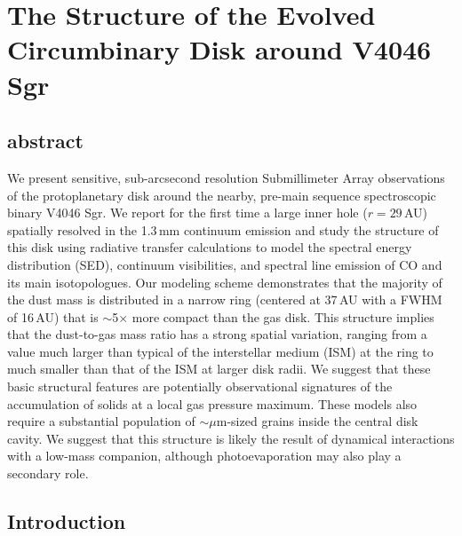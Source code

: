
\chapter{The Structure of the Evolved Circumbinary Disk around V4046 Sgr}{\label{chap:v4046_structure}

\section*{abstract}
We present sensitive, sub-arcsecond resolution Submillimeter Array observations 
of the protoplanetary disk around the nearby, pre-main sequence spectroscopic 
binary V4046 Sgr.  We report for the first time a large inner hole ($r=29$\,AU) 
spatially resolved in the 1.3\,mm continuum emission and study the structure of 
this disk using radiative transfer calculations to model the spectral energy
distribution (SED), continuum visibilities, and spectral line emission of CO and
its main isotopologues.  Our modeling scheme demonstrates that the majority of 
the dust mass is distributed in a narrow ring (centered at 37\,AU with a FWHM of
16\,AU) that is $\sim$5$\times$ more compact than the gas disk.  This structure 
implies that the dust-to-gas mass ratio has a strong spatial variation, ranging 
from a value much larger than typical of the interstellar medium (ISM) at the 
ring to much smaller than that of the ISM at larger disk radii.  We suggest that
these basic structural features are potentially observational signatures of the 
accumulation of solids at a local gas pressure maximum.  These models also 
require a substantial population of $\sim$$\mu$m-sized grains inside the central
disk cavity.  We suggest that this structure is likely the result of dynamical 
interactions with a low-mass companion, although photoevaporation may also play 
a secondary role.


\section{Introduction} \label{sec:intro}

}
